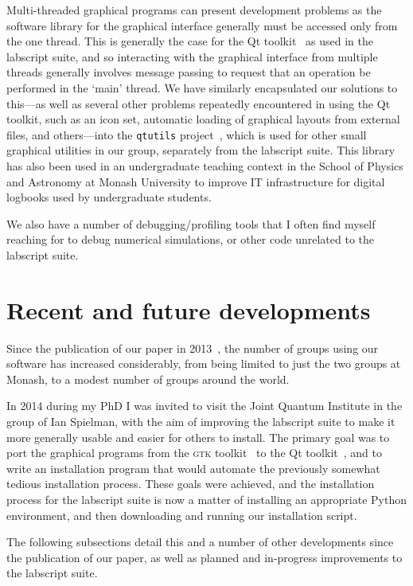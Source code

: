 Multi-threaded graphical programs can present development problems as the software library for the graphical interface generally must be accessed only from the one thread. This is generally the case for the Qt toolkit~\cite{the_qt_company_qt_2018} as used in the labscript suite, and so interacting with the graphical interface from multiple threads generally involves message passing to request that an operation be performed in the `main' thread. We have similarly encapsulated our solutions to this---as well as several other problems repeatedly encountered in using the Qt toolkit, such as an icon set, automatic loading of graphical layouts from external files, and others---into the \texttt{qtutils} project~\cite{starkey_qtutils_2018}, which is used for other small graphical utilities in our group, separately from the labscript suite. This library has also been used in an undergraduate teaching context in the School of Physics and Astronomy at Monash University to improve IT infrastructure for digital logbooks used by undergraduate students.

We also have a number of debugging/profiling tools that I often find myself reaching for to debug numerical simulations, or other code unrelated to the labscript suite.


\section{Recent and future developments}

Since the publication of our paper in 2013~\cite{starkey_scripted_2013}, the number of groups using our software has increased considerably, from being limited to just the two groups at Monash, to a modest number of groups around the world.

In 2014 during my PhD I was invited to visit the Joint Quantum Institute in the group of Ian Spielman, with the aim of improving the labscript suite to make it more generally usable and easier for others to install. The primary goal was to port the graphical programs from the \textsc{gtk} toolkit~\cite{the_gnome_project_gtk+_2018} to the Qt toolkit~\cite{the_qt_company_qt_2018}, and to write an installation program that would automate the previously somewhat tedious installation process. These goals were achieved, and the installation process for the labscript suite is now a matter of installing an appropriate Python environment, and then downloading and running our installation script.

The following subsections detail this and a number of other developments since the publication of our paper, as well as planned and in-progress improvements to the labscript suite.

